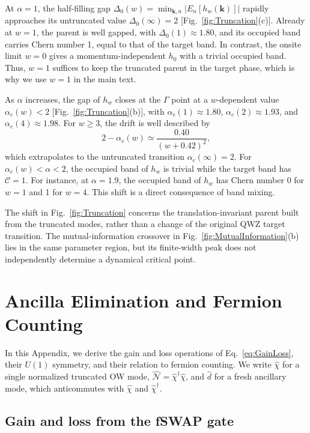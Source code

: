 \documentclass[aps,prb,10pt,twocolumn,superscriptaddress,longbibliography,floatfix]{revtex4-2}
\newcommand{\mc}[1]{\mathcal{#1}}
\newcommand{\bk}{\boldsymbol k}
\begin{document}
At $\alpha=1$, the half-filling gap $\Delta_0(w)=\min_{\bk,n}|E_n[h_w(\bk)]|$ rapidly approaches its untruncated value $\Delta_0(\infty)=2$ [Fig.~\ref{fig:Truncation}(c)]. Already at $w=1$, the parent is well gapped, with $\Delta_0(1)\approx1.80$, and its occupied band carries Chern number 1, equal to that of the target band. In contrast, the onsite limit $w=0$ gives a momentum-independent $h_0$ with a trivial occupied band. Thus, $w=1$ suffices to keep the truncated parent in the target phase, which is why we use $w=1$ in the main text.

As $\alpha$ increases, the gap of $h_w$ closes at the $\Gamma$ point at a $w$-dependent value $\alpha_c(w)<2$ [Fig.~\ref{fig:Truncation}(b)], with $\alpha_c(1)\approx1.80$, $\alpha_c(2)\approx1.93$, and $\alpha_c(4)\approx1.98$. For $w\geq3$, the drift is well described by
\begin{equation}
    2-\alpha_c(w)\simeq\frac{0.40}{(w+0.42)^2},
    \label{eq:CriticalDrift}
\end{equation}
which extrapolates to the untruncated transition $\alpha_c(\infty)=2$. For $\alpha_c(w)<\alpha<2$, the occupied band of $h_w$ is trivial while the target band has $\mc C=1$. For instance, at $\alpha=1.9$, the occupied band of $h_w$ has Chern number 0 for $w=1$ and 1 for $w=4$. This shift is a direct consequence of band mixing.

{\color{blue}
The shift in Fig.~\ref{fig:Truncation} concerns the translation-invariant parent built from the truncated modes, rather than a change of the original QWZ target transition. The mutual-information crossover in Fig.~\ref{fig:MutualInformation}(b) lies in the same parameter region, but its finite-width peak does not independently determine a dynamical critical point.
}

\section{Ancilla Elimination and Fermion Counting}
\label{app:FermionCounting}

In this Appendix, we derive the gain and loss operations of Eq.~\eqref{eq:GainLoss}, their $U(1)$ symmetry, and their relation to fermion counting. We write $\hat\chi$ for a single normalized truncated OW mode, $\hat{\mc N}=\hat\chi^\dagger\hat\chi$, and $\hat d$ for a fresh ancillary mode, which anticommutes with $\hat\chi$ and $\hat\chi^\dagger$.

\subsection{Gain and loss from the fSWAP gate}
\end{document}
